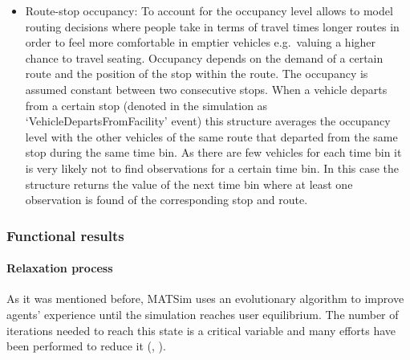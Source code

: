 \begin{itemize}
\item Route-stop occupancy: To account for the occupancy level allows to model routing decisions where people take in terms of travel times longer routes in order to feel more comfortable in emptier vehicles e.g.\ valuing a higher chance to travel seating. Occupancy depends on the demand of a certain route and the position of the stop within the route. The occupancy is assumed constant between two consecutive stops. When a vehicle departs from a certain stop (denoted in the simulation as `VehicleDepartsFromFacility' event) this structure averages the occupancy level with the other vehicles of the same route that departed from the same stop during the same time bin. As there are few vehicles for each time bin it is very likely not to find observations for a certain time bin. In this case the structure returns the value of the next time bin where at least one observation is found of the corresponding stop and route.

\end{itemize}

\subsubsection{Functional results}

\paragraph{Relaxation process}

As it was mentioned before, MATSim uses an evolutionary algorithm to improve agents' experience until the simulation reaches user equilibrium. The number of iterations needed to reach this state is a critical variable and many efforts have been performed to reduce it (\citep{MeisterEtAl_STRC_2006}, \citep{FourieEtAl_TRB_2013}).

